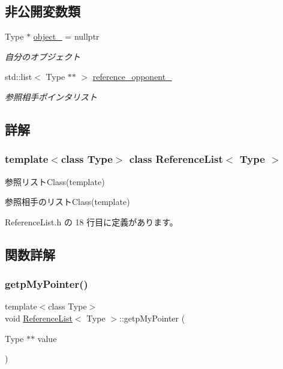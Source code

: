 \subsection*{非公開変数類}
\begin{DoxyCompactItemize}
\item 
Type $\ast$ \mbox{\hyperlink{class_reference_list_a4db4d51f2d810aea8668abdae6f0bd56}{object\+\_\+}} = nullptr
\begin{DoxyCompactList}\small\item\em 自分のオブジェクト \end{DoxyCompactList}\item 
std\+::list$<$ Type $\ast$$\ast$ $>$ \mbox{\hyperlink{class_reference_list_a3730c5bad58a49a53810c08f235b867c}{reference\+\_\+opponent\+\_\+}}
\begin{DoxyCompactList}\small\item\em 参照相手ポインタリスト \end{DoxyCompactList}\end{DoxyCompactItemize}


\subsection{詳解}
\subsubsection*{template$<$class Type$>$\newline
class Reference\+List$<$ Type $>$}

参照リスト\+Class(template) 

参照相手のリスト\+Class(template) 

 Reference\+List.\+h の 18 行目に定義があります。



\subsection{関数詳解}
\mbox{\label{class_reference_list_a4ea7062b9314814866c9b3990ea59e49}} 
\subsubsection{\texorpdfstring{getp\+My\+Pointer()}{getpMyPointer()}}
{\footnotesize\ttfamily template$<$class Type$>$ \\
void \mbox{\hyperlink{class_reference_list}{Reference\+List}}$<$ Type $>$\+::getp\+My\+Pointer (\begin{DoxyParamCaption}\item[{Type $\ast$$\ast$}]{value }\end{DoxyParamCaption})\hspace{0.3cm}{\ttfamily [inline]}}



